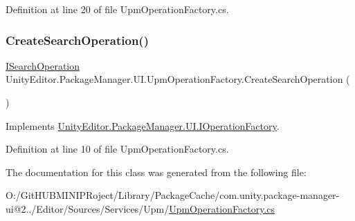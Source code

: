 Definition at line 20 of file Upm\+Operation\+Factory.\+cs.

\mbox{\label{class_unity_editor_1_1_package_manager_1_1_u_i_1_1_upm_operation_factory_a49788149061bc550315ab55adb0a89d8}} 
\subsubsection{\texorpdfstring{CreateSearchOperation()}{CreateSearchOperation()}}
{\footnotesize\ttfamily \mbox{\hyperlink{interface_unity_editor_1_1_package_manager_1_1_u_i_1_1_i_search_operation}{I\+Search\+Operation}} Unity\+Editor.\+Package\+Manager.\+U\+I.\+Upm\+Operation\+Factory.\+Create\+Search\+Operation (\begin{DoxyParamCaption}{ }\end{DoxyParamCaption})}



Implements \mbox{\hyperlink{interface_unity_editor_1_1_package_manager_1_1_u_i_1_1_i_operation_factory_a1e4b0e667c493749785f3444697e59ce}{Unity\+Editor.\+Package\+Manager.\+U\+I.\+I\+Operation\+Factory}}.



Definition at line 10 of file Upm\+Operation\+Factory.\+cs.



The documentation for this class was generated from the following file\+:\begin{DoxyCompactItemize}
\item 
O\+:/\+Git\+H\+U\+B\+M\+I\+N\+I\+P\+Roject/\+Library/\+Package\+Cache/com.\+unity.\+package-\/manager-\/ui@2../\+Editor/\+Sources/\+Services/\+Upm/\mbox{\hyperlink{_upm_operation_factory_8cs}{Upm\+Operation\+Factory.\+cs}}\end{DoxyCompactItemize}
